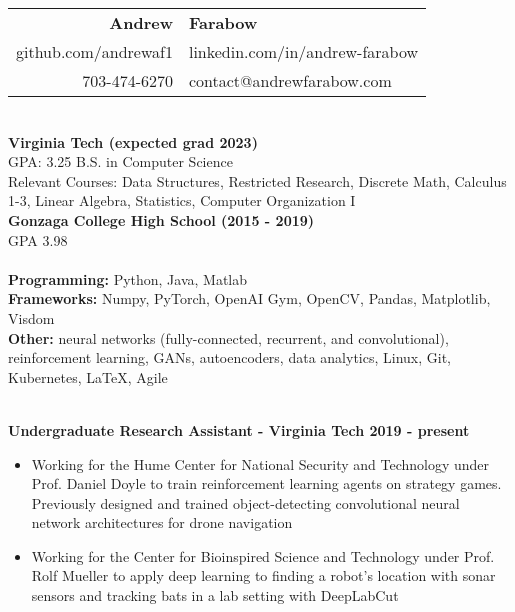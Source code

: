 \documentclass{article}
\begin{document}
  \begin{center}
    \begin{tabular}{r l}
      {\huge\textbf{Andrew}} & {\huge\textbf{Farabow}} \\
      \hspace{35pt} github.com/andrewaf1 & linkedin.com/in/andrew-farabow \\
      703-474-6270 & contact@andrewfarabow.com \\
    \end{tabular}


  \begin{flushleft}
    \begin{multicols}{2}
      {\large\textbf{\underline{}}} \\
      \textbf{Virginia Tech (expected grad 2023)} \\
      GPA: 3.25 \quad B.S. in Computer Science \\
      Relevant Courses: Data Structures, Restricted Research, Discrete Math, Calculus 1-3, Linear Algebra, Statistics, Computer Organization I\\
      \textbf{Gonzaga College High School	(2015 - 2019)} \\
      GPA 3.98 \\
     

    \columnbreak
    {\large\textbf{\underline{}}} \\
    {\textbf{Programming:}} Python, Java, Matlab \\
    {\textbf{Frameworks:}} Numpy, PyTorch, OpenAI Gym, OpenCV, Pandas, Matplotlib, Visdom \\
    {\textbf{Other:}} neural networks (fully-connected, recurrent, and convolutional), reinforcement learning, GANs, autoencoders, data analytics, Linux, Git, Kubernetes, LaTeX, Agile \\

    \end{multicols}

    {\large\textbf{\underline{}}} \\
    \textbf{Undergraduate Research Assistant - Virginia Tech \hfill 2019 - present}
    \begin{itemize}
      \itemsep0em
      \item Working for the Hume Center for National Security and Technology under Prof. Daniel Doyle to train reinforcement learning agents on strategy games. Previously designed and trained object-detecting convolutional neural network architectures for drone navigation
      \item Working for the Center for Bioinspired Science and Technology under Prof. Rolf Mueller to apply deep learning to finding a robot's location with sonar sensors and tracking bats in a lab setting with DeepLabCut
    \end{itemize}



\end{flushleft}
\end{center}
\end{document}
